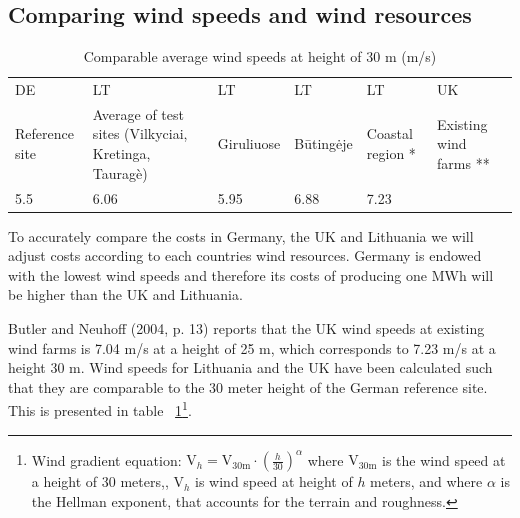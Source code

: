 \documentclass[a4paper, 12pt]{article}
\begin{document}
\subsection{Comparing wind speeds and wind resources}

\begin{table}
	\begin{tabular}{|p{2cm}|p{3cm}|p{2cm}|p{2cm}|p{2cm}|p{3cm}|}
	  DE & LT & LT & LT & LT & UK \\
	  Reference site & Average of test sites (Vilkyciai, Kretinga, Tauragè) & Giruliuose & Būtingėje & Coastal region * & Existing wind farms ** \\
	  5.5 & 6.06 & 5.95 & 6.88 & 7.23 \\
	\end{tabular}
	\caption{Comparable average wind speeds at height of 30 m (m/s)}
	\label{tab:table_avgwindspeeds}
\end{table}


To accurately compare the costs in Germany, the UK and Lithuania we will adjust costs according to each countries wind resources. Germany is endowed with the lowest wind speeds and therefore its costs of producing one MWh will be higher than the UK and Lithuania. 

Butler and Neuhoff (2004, p. 13) reports that the UK wind speeds at existing wind farms is 7.04 m/s at a height of 25 m, which corresponds to 7.23 m/s at a height 30 m. Wind speeds for Lithuania and the UK have been calculated such that they are comparable to the 30 meter height of the German reference site. This is presented in table ~\ref{tab:table_avgwindspeeds}\footnote{Wind gradient equation: $\text{V}_h = \text{V}_\text{30m} \cdot \left(\frac{h}{30}\right)^\alpha$ where $\text{V}_\text{30m}$ is the wind speed at a height of 30 meters,, $\text{V}_h$ is wind speed at height of $h$ meters, and where  $\alpha$ is the Hellman exponent, that accounts for the terrain and roughness.}.
\end{document}
